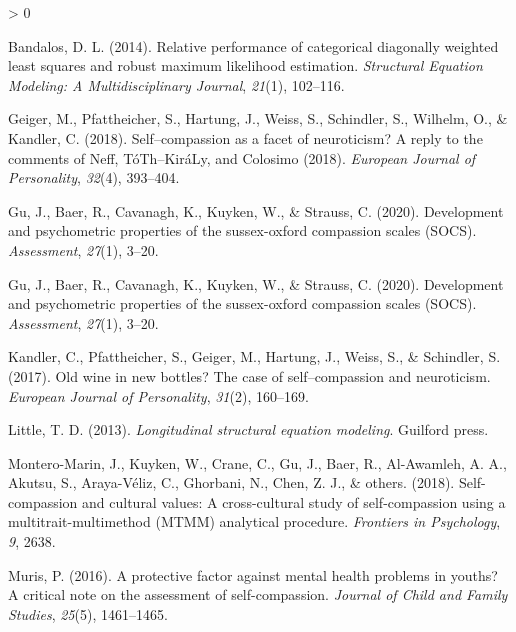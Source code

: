 \documentclass[
  english,
  man,floatsintext]{apa7}
\newlength{\cslhangindent}
\newenvironment{CSLReferences}[2] %
 {%
  \setlength{\parindent}{0pt}
  \ifodd #1 \everypar{\setlength{\hangindent}{\cslhangindent}}\ignorespaces\fi
  \ifnum #2 > 0
  \setlength{\parskip}{#2\baselineskip}
  \fi
 }%
 {}
\begin{document}
\begingroup
\setlength{\parindent}{-0.5in}
\setlength{\leftskip}{0.5in}

\hypertarget{refs}{}
\begin{CSLReferences}{1}{0}
\leavevmode\hypertarget{ref-bandalos2014relative}{}%
Bandalos, D. L. (2014). Relative performance of categorical diagonally weighted least squares and robust maximum likelihood estimation. \emph{Structural Equation Modeling: A Multidisciplinary Journal}, \emph{21}(1), 102--116.

\leavevmode\hypertarget{ref-geiger2018self}{}%
Geiger, M., Pfattheicher, S., Hartung, J., Weiss, S., Schindler, S., Wilhelm, O., \& Kandler, C. (2018). Self--compassion as a facet of neuroticism? A reply to the comments of {Neff, T{ó}Th--Kir{á}Ly, and Colosimo (2018)}. \emph{European Journal of Personality}, \emph{32}(4), 393--404.

\leavevmode\hypertarget{ref-gu2020development}{}%
Gu, J., Baer, R., Cavanagh, K., Kuyken, W., \& Strauss, C. (2020). Development and psychometric properties of the sussex-oxford compassion scales (SOCS). \emph{Assessment}, \emph{27}(1), 3--20.

\leavevmode\hypertarget{ref-gu2020development}{}%
Gu, J., Baer, R., Cavanagh, K., Kuyken, W., \& Strauss, C. (2020). Development and psychometric properties of the sussex-oxford compassion scales (SOCS). \emph{Assessment}, \emph{27}(1), 3--20.

\leavevmode\hypertarget{ref-kandler2017old}{}%
Kandler, C., Pfattheicher, S., Geiger, M., Hartung, J., Weiss, S., \& Schindler, S. (2017). Old wine in new bottles? The case of self--compassion and neuroticism. \emph{European Journal of Personality}, \emph{31}(2), 160--169.

\leavevmode\hypertarget{ref-little2013longitudinal}{}%
Little, T. D. (2013). \emph{Longitudinal structural equation modeling}. Guilford press.

\leavevmode\hypertarget{ref-montero2018self}{}%
Montero-Marin, J., Kuyken, W., Crane, C., Gu, J., Baer, R., Al-Awamleh, A. A., Akutsu, S., Araya-Véliz, C., Ghorbani, N., Chen, Z. J., \& others. (2018). Self-compassion and cultural values: A cross-cultural study of self-compassion using a multitrait-multimethod (MTMM) analytical procedure. \emph{Frontiers in Psychology}, \emph{9}, 2638.

\leavevmode\hypertarget{ref-muris2016protective}{}%
Muris, P. (2016). A protective factor against mental health problems in youths? A critical note on the assessment of self-compassion. \emph{Journal of Child and Family Studies}, \emph{25}(5), 1461--1465.


\end{CSLReferences}
\end{document}
